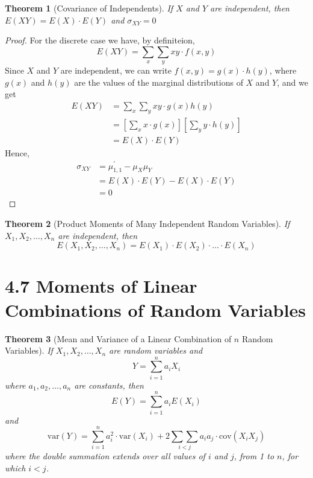 \documentclass[
10pt,reqno
]{amsart}
\newtheorem{theorem}{Theorem}[section]
\theoremstyle{definition}
\begin{document}
\begin{theorem}[Covariance of Independents]
If \(X\) and \(Y\) are independent, then \(E(XY)= E(X) \cdot E(Y)\) and \(\sigma_{XY} =0 \)
\end{theorem}
\begin{proof}
For the discrete case we have, by definiteion, 
\[
E(XY)=\sum_x \sum_y xy \cdot f(x,y)
\]
Since \(X\) and \(Y\) are independent, we can write \(f(x,y)=g(x)\cdot h(y)\), where \(g(x)\) and \(h(y)\) are the values of the marginal distributions of \(X\) and \(Y\), and we get
\begin{align*}
E(XY)&=\sum_x \sum_y xy \cdot g(x) h(y)\\
&=\left [ \sum_x x \cdot g(x) \right ]\left [ \sum_y y \cdot h(y) \right ]\\
&= E(X) \cdot E(Y)
\end{align*}
Hence,
\begin{align*}
\sigma_{XY} &= \mu_{1,1}^{'}-\mu_{X} \mu_{Y}\\
&=E(X) \cdot E(Y) - E(X) \cdot E(Y)\\
&=0
\end{align*}
\end{proof}

\begin{theorem}[Product Moments of Many Independent Random Variables]
If \(X_1, X_2,\ldots,X_n\) are independent, then 
\[
E(X_1, X_2,\ldots,X_n)=E(X_1)\cdot E(X_2) \cdot \ldots \cdot E(X_n)
\]
\end{theorem}

\newpage

\section*{4.7 Moments of Linear Combinations of Random Variables}

\begin{theorem}[Mean and Variance of a Linear Combination of \(n\) Random Variables]
If \(X_1, X_2,\ldots,X_n\) are random variables and 
\[
Y = \sum_{i=1}^n a_i X_i
\]
where \(a_1, a_2, \ldots, a_n\) are constants, then 
\[
E(Y) = \sum_{i=1}^n a_i E(X_i)
\]
and
\[
\text{var}(Y)=\sum_{i=1}^n a_i^2 \cdot \text{var}(X_i)+ 2 \underset{i < j}{\sum \sum} a_i a_j \cdot \text{cov} (X_i X_j)
\]
where the double summation extends over all values of \(i\) and \(j\), from 1 to \(n\), for which \(i < j\).
\end{theorem}
\end{document}
